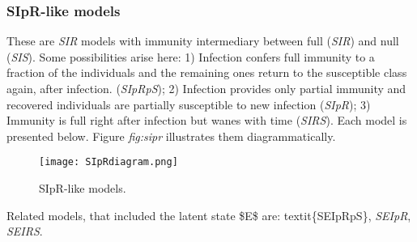 \documentclass[a4paper,10pt,english]{sphinxmanual}
\begin{document}
\subsubsection{SIpR-like models}
\label{intromodels:sipr-like-models}
These are \emph{SIR} models with immunity intermediary between full (\emph{SIR}) and null (\emph{SIS}).
Some possibilities arise here: 1) Infection confers full immunity to a fraction of the individuals and the remaining ones return to the susceptible class again, after infection. (\emph{SIpRpS}); 2) Infection provides only partial immunity and recovered individuals are partially susceptible to new infection (\emph{SIpR}); 3) Immunity is full right after infection but wanes with time (\emph{SIRS}). Each model is presented below. Figure \emph{fig:sipr} illustrates them diagrammatically.
\begin{figure}[htbp]
\centering
\capstart

\texttt{[image: SIpRdiagram.png]}
\caption{SIpR-like models.}\end{figure}

Related models, that included the latent state \$E\$ are: textit\{SEIpRpS\}, \emph{SEIpR}, \emph{SEIRS}.
\end{document}
